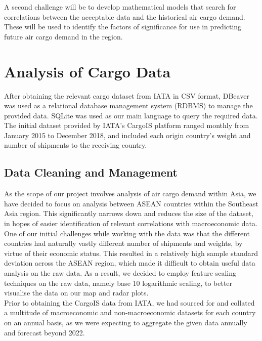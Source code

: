 \documentclass{article}
\begin{document}
\noindent A second challenge will be to develop mathematical models that search for correlations between the acceptable data and the historical air cargo demand. These will be used to identify the factors of significance for use in predicting future air cargo demand in the region. 


\section{Analysis of Cargo Data}

After obtaining the relevant cargo dataset from IATA in CSV format, DBeaver was used as a relational database management system (RDBMS) to manage the provided data. SQLite was used as our main language to query the required data. \\

\noindent The initial dataset provided by IATA's CargoIS platform ranged monthly from January 2015 to December 2018, and included each origin country's weight and number of shipments to the receiving country.


\subsection{Data Cleaning and Management}

As the scope of our project involves analysis of air cargo demand within Asia, we have decided to focus on analysis between ASEAN countries within the Southeast Asia region. This significantly narrows down and reduces the size of the dataset, in hopes of easier identification of relevant correlations with macroeconomic data. \\

\noindent One of our initial challenges while working with the data was that the different countries had naturally vastly different number of shipments and weights, by virtue of their economic status. This resulted in a relatively high sample standard deviation across the ASEAN region, which made it difficult to obtain useful data analysis on the raw data. As a result, we decided to employ feature scaling techniques on the raw data, namely base 10 logarithmic scaling, to better visualise the data on our map and radar plots. \\

\noindent Prior to obtaining the CargoIS data from IATA, we had sourced for and collated a multitude of macroeconomic and non-macroeconomic datasets for each country on an annual basis, as we were expecting to aggregate the given data annually and forecast beyond 2022. \\
\end{document}
